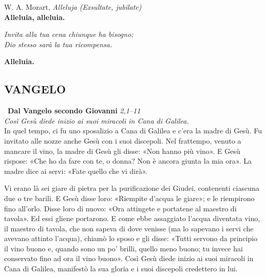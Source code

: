 \documentclass[10pt,b6paper,usenames,twoside]{article}
\begin{document}
\noindent \textcolor{forestgreen(traditional)}{\Acht} \hspace*{0mm} W. A. Mozart, \textit{Alleluja (Exsultate, jubilate)} \\ 

\noindent \textbf{Alleluia, alleluia.}\\
\vspace*{-0.5mm}
\hfill\begin{minipage}{\dimexpr\textwidth-1cm}
\vspace*{1mm}\textit{Invita alla tua cena chiunque ha bisogno;\\
Dio stesso sarà la tua ricompensa.
}
\end{minipage} 

\noindent \textbf{Alleluia.}
\subsection*{\textcolor{forestgreen(traditional)}{VANGELO}} 

\noindent \textcolor{forestgreen(traditional)}{\CrossMaltese} \ \textbf{Dal Vangelo secondo Giovanni} \hfill \textcolor{forestgreen(traditional)}{\textit{2,1--11}}\\ 
\textcolor{forestgreen(traditional)}{\textit{\footnotesize{Così Gesù diede inizio ai suoi miracoli in Cana di Galilea.}}} \\ 

In quel tempo, ci fu uno sposalizio a Cana di Galilea e c’era la madre di Gesù. Fu invitato alle nozze anche Gesù con i suoi discepoli. Nel frattempo, venuto a mancare il vino, la madre di Gesù gli disse: «Non hanno più vino». E Gesù rispose: «Che ho da fare con te, o donna? Non è ancora giunta la mia ora». La madre dice ai servi: «Fate quello che vi dirà».

Vi erano là sei giare di pietra per la purificazione dei Giudei, contenenti ciascuna due o tre barili. E Gesù disse loro: «Riempite d’acqua le giare»; e le riempirono fino all’orlo. Disse loro di nuovo: «Ora attingete e portatene al maestro di tavola». Ed essi gliene portarono. E come ebbe assaggiato l’acqua diventata vino, il maestro di tavola, che non sapeva di dove venisse (ma lo sapevano i servi che avevano attinto l’acqua), chiamò lo sposo e gli disse: «Tutti servono da principio il vino buono e, quando sono un po’ brilli, quello meno buono; tu invece hai conservato fino ad ora il vino buono». Così Gesù diede inizio ai suoi miracoli in Cana di Galilea, manifestò la sua gloria e i suoi discepoli credettero in lui. 
\end{document}
